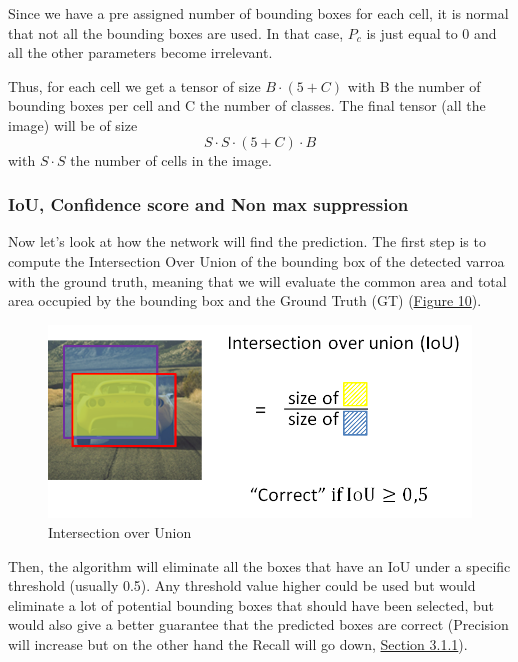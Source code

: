 \documentclass{article}
\begin{document}
 Since we have a pre assigned number of bounding boxes for each cell, it is normal that not all the bounding boxes are used. In that case, $P_c$ is just equal to 0 and all the other parameters become irrelevant.
 
 \bigskip
 
 Thus, for each cell we get a tensor of size $B \cdot (5+C)$ with B the number of bounding boxes per cell and C the number of classes. The final tensor (all the image) will be of size $$S \cdot S \cdot (5+C) \cdot B$$ with $S \cdot S$ the number of cells in the image. 
 
\newpage

\subsubsection{IoU, Confidence score and Non max suppression}

Now let's look at how the network will find the prediction.
The first step is to compute the Intersection Over Union of the bounding box of the detected varroa with the ground truth, meaning that we will evaluate the common area and total area occupied by the bounding box and the Ground Truth (GT) (\hyperref[Figure 10]{Figure 10}).

\begin{figure}[!ht]
  \centering
  \includegraphics[scale=0.75]{metrics/IoU.png}
  \caption{Intersection over Union}
  \label{Figure 10}
\end{figure}

\bigskip

Then, the algorithm will eliminate all the boxes that have an IoU under a specific threshold (usually 0.5). Any threshold value higher could be used but would eliminate a lot of potential bounding boxes that should have been selected, but would also give a better guarantee that the predicted boxes are correct (Precision will increase but on the other hand the Recall will go down, \hyperref[Section 3.1.1]{Section 3.1.1}).
\end{document}
